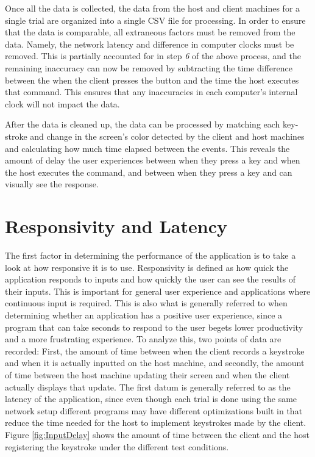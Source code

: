 \noindent
Once all the data is collected, the data from the host and client machines for a single trial are organized into a single CSV file for processing.
In order to ensure that the data is comparable, all extraneous factors must be removed from the data.
Namely, the network latency and difference in computer clocks must be removed.
This is partially accounted for in step \emph{6} of the above process, and the remaining inaccuracy can now be removed by subtracting the time difference between the when the client presses the button and the time the host executes that command.
This ensures that any inaccuracies in each computer's internal clock will not impact the data.

After the data is cleaned up, the data can be processed by matching each key-stroke and change in the screen's color detected by the client and host machines and calculating how much time elapsed between the events.
This reveals the amount of delay the user experiences between when they press a key and when the host executes the command, and between when they press a key and can visually see the response.


\section{Responsivity and Latency}\label{sec:ResponsivityAndLatency}

The first factor in determining the performance of the application is to take a look at how responsive it is to use.
Responsivity is defined as how quick the application responds to inputs and how quickly the user can see the results of their inputs.
This is important for general user experience and applications where continuous input is required.
This is also what is generally referred to when determining whether an application has a positive user experience, since a program that can take seconds to respond to the user begets lower productivity and a more frustrating experience.
To analyze this, two points of data are recorded: First, the amount of time between when the client records a keystroke and when it is actually inputted on the host machine, and secondly, the amount of time between the host machine updating their screen and when the client actually displays that update.
The first datum is generally referred to as the latency of the application, since even though each trial is done using the same network setup different programs may have different optimizations built in that reduce the time needed for the host to implement keystrokes made by the client.
Figure \ref{fig:InputDelay} shows the amount of time between the client and the host registering the keystroke under the different test conditions.


